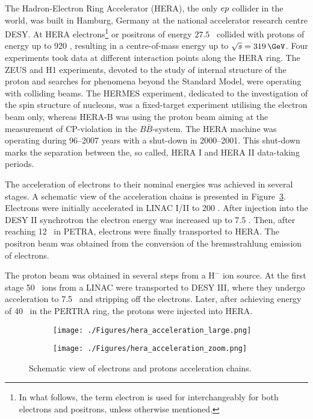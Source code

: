 The Hadron-Electron Ring Accelerator (HERA), the only $\mbox{$e p$}$ collider in the world, was built in Hamburg, Germany at the national accelerator research centre DESY. At HERA electrons\footnote{In what follows, the term electron is used for interchangeably for both electrons and positrons, unless otherwise mentioned.} or positrons of energy $27.5$ \GeV\, collided with protons of energy up to 920 \GeV, resulting in a centre-of-mass energy up to $\sqs = 319\, \GeV$. Four experiments took data at different interaction points along the HERA ring. The ZEUS and H1 experiments, devoted to the study of internal structure of the proton and searches for phenomena beyond the Standard Model, were operating with colliding beams. The HERMES experiment, dedicated to the investigation of the spin structure of nucleons, was a fixed-target experiment utilising the electron beam only, whereas HERA-B was using the proton beam aiming at the measurement of CP-violation in the $B\bar{B}$-system. The HERA machine was operating during 96--2007 years with a shut-down in 2000--2001. This shut-down marks the separation between the, so called, HERA I and HERA II data-taking periods.

The acceleration of electrons to their nominal energies was achieved in several stages. A schematic view of the acceleration chains is presented in Figure~\ref{fig:hera_acceleration}. Electrons were initially accelerated in LINAC I/II to 200 \MeV. After injection into the DESY II synchrotron the electron energy was increased up to 7.5 \GeV. Then, after reaching 12 \GeV\, in PETRA, electrons were finally transported to HERA. The positron beam was obtained from the conversion of the bremsstrahlung emission of electrons. 

The proton beam was obtained in several steps from a $\text{H}^-$ ion source. At the first stage 50 \MeV\, ions from a LINAC were transported to DESY III, where they undergo acceleration to 7.5 \GeV\, and stripping off the electrons. Later, after achieving energy of 40 \GeV\, in the PERTRA ring, the protons were injected into HERA.

\begin{figure}
	\centering
	\begin{subfigure}{.49\textwidth}
		\centering
		\texttt{[image: ./Figures/hera\_acceleration\_large.png]}
		\label{fig:hera_acceleration_large}
	\end{subfigure}
	\begin{subfigure}{.49\textwidth}
		\texttt{[image: ./Figures/hera\_acceleration\_zoom.png]}
		\label{fig:hera_acceleration_zoom}
	\end{subfigure}
	\caption{Schematic view of electrons and protons acceleration chains.}
\label{fig:hera_acceleration}
\end{figure}

